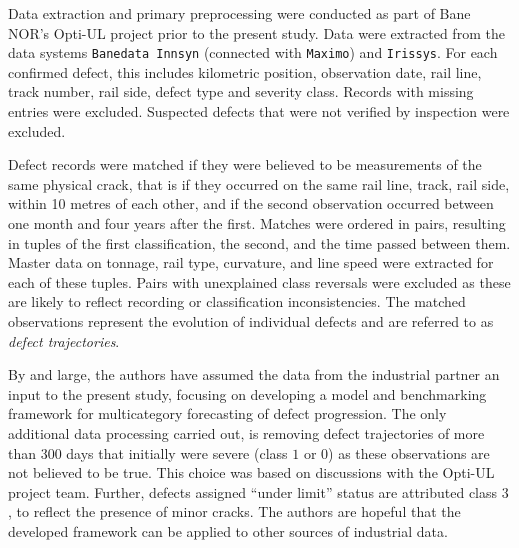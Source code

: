 \documentclass{article}
\providecommand{\DIFadd}[1]{{\protect\color{blue} \sf #1}} %
\providecommand{\DIFaddbegin}{} %
\providecommand{\DIFaddend}{} %
\begin{document}
\DIFaddbegin \DIFadd{Data extraction and primary preprocessing were conducted as part of Bane NOR's Opti-UL project prior to the present study. Data were extracted from the data systems \texttt{Banedata Innsyn} (connected with \texttt{Maximo}) and \texttt{Irissys}. For each confirmed defect, this includes kilometric position, observation date, rail line, track number, rail side, defect type and severity class. Records with missing entries were excluded. Suspected defects that were not verified by inspection were excluded.
}\DIFaddend 

\DIFaddbegin \DIFadd{Defect records were matched if they were believed to be measurements of the same physical crack, that is if they occurred on the same rail line, track, rail side, within 10 metres of each other, and if the second observation occurred between one month and four years after the first. Matches were ordered in pairs, resulting in tuples of the first classification, the second, and the time passed between them. Master data on tonnage, rail type, curvature, and line speed were extracted for each of these tuples. Pairs with unexplained class reversals were excluded as these are likely to reflect recording or classification inconsistencies. The matched observations represent the evolution of individual defects and are referred to as \textit{defect trajectories}.
}


\DIFadd{By and large, the authors have assumed the data from the industrial partner an input to the present study, focusing on developing a model and benchmarking framework for multicategory forecasting of defect progression. The only additional data processing carried out, is removing defect trajectories of more than 300 days that initially were severe (class $1$ or $0$) as these observations are not believed to be true. This choice was based on discussions with the Opti-UL project team. Further, defects assigned ``under limit'' status are attributed class $3$, to reflect the presence of minor cracks.
The authors are hopeful that the developed framework can be applied to other sources of industrial data.
}
\end{document}
